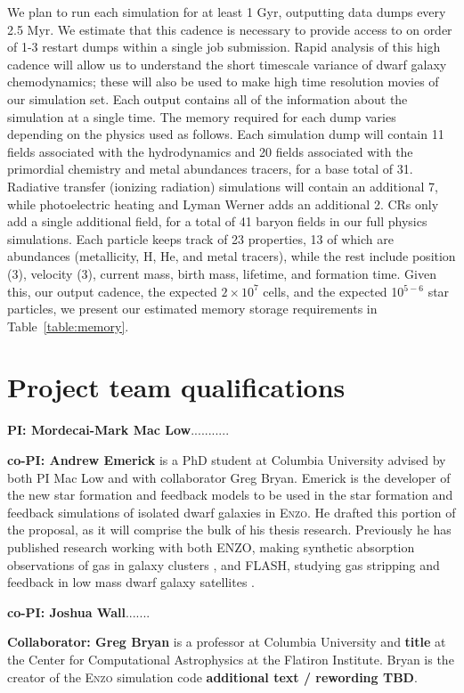 \documentclass[11pt]{article}
\begin{document}
We plan to run each simulation for at least 1 Gyr, outputting data dumps every 2.5 Myr. We estimate that this cadence is necessary to provide access to on order of 1-3 restart dumps within a single job submission. Rapid analysis of this high cadence will allow us to understand the short timescale variance of dwarf galaxy chemodynamics; these will also be used to make high time resolution movies of our simulation set. Each output contains all of the information about the simulation at a single time. The memory required for each dump varies depending on the physics used as follows. Each simulation dump will contain 11 fields associated with the hydrodynamics and 20 fields associated with the primordial chemistry and metal abundances tracers, for a base total of 31. Radiative transfer (ionizing radiation) simulations will contain an additional 7, while photoelectric heating and Lyman Werner adds an additional 2. CRs only add a single additional field, for a total of 41 baryon fields in our full physics simulations. Each particle keeps track of 23 properties, 13 of which are abundances (metallicity, H, He, and metal tracers), while the rest include position (3), velocity (3), current mass, birth mass, lifetime, and formation time. Given this, our output cadence, the expected $2 \times 10^{7}$ cells, and the expected 10$^{5-6}$ star particles, we present our estimated memory storage requirements in Table~\ref{table:memory}.

\section{Project team qualifications}

\textbf{PI: Mordecai-Mark Mac Low}...........

\textbf{co-PI: Andrew Emerick} is a PhD student at Columbia University advised by both PI Mac Low and with collaborator Greg Bryan. Emerick is the developer of the new star formation and feedback models to be used in the star formation and feedback simulations of isolated dwarf galaxies in \textsc{Enzo}. He drafted this portion of the proposal, as it will comprise the bulk of his thesis research. Previously he has published research working with both \textsc{ENZO}, making synthetic absorption observations of gas in galaxy clusters \citep{Emerick2015}, and \textsc{FLASH}, studying gas stripping and feedback in low mass dwarf galaxy satellites \citep{Emerick2016}.

\textbf{co-PI: Joshua Wall}.......

\textbf{Collaborator: Greg Bryan} is a professor at Columbia University and {\bf title} at the Center for Computational Astrophysics at the Flatiron Institute. Bryan is the creator of the \textsc{Enzo} simulation code {\bf additional text / rewording TBD}.
\end{document}
